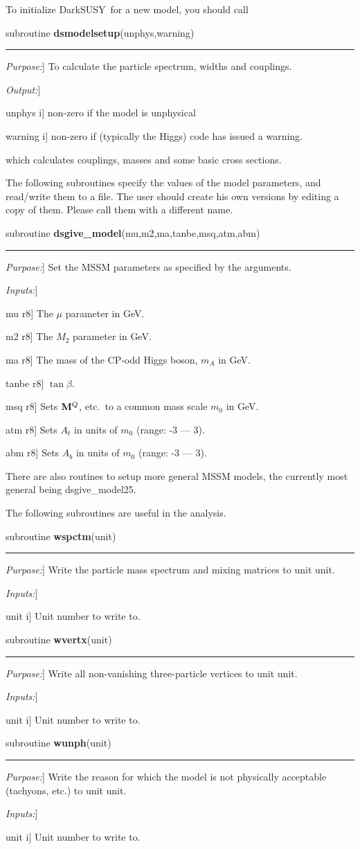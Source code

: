 \documentclass[a4paper,10pt,oneside]{book}
\newcommand{\code}[1]{\ft{#1}}
\newcommand{\ds}{{\sffamily DarkSUSY}}
\newenvironment{allsubs}{\begin{list}{}{\setlength{\labelsep}{0.0 cm}
\setlength{\labelwidth}{0.0 cm} \setlength{\leftmargin}{0.0 cm}
\setlength{\itemsep}{0.6ex} \setlength{\topsep}{\itemsep}}}{\end{list}}
\newenvironment{subs}{\begin{list}{}{\setlength{\labelwidth}{2.0 cm}
\setlength{\labelsep}{0.5 cm} \setlength{\leftmargin}{3.0 cm}
\setlength{\itemsep}{0.0 cm} \setlength{\parsep}{0.0 cm}
\setlength{\topsep}{0.0 cm} \setlength{\parskip}{0.0 cm}}}{\end{list}}
\newenvironment{sub}[1]%
{\begin{allsubs}\item \tw{#1\raisebox{-0.5ex}{}}\hrule\begin{subs}}
{\end{subs}\end{allsubs}}
\newcommand{\lft}[1]{\makebox[2.0 cm][l]{\em #1}}   %
\newcommand{\lfv}[1]{\makebox[1.5 cm][l]{\sffamily #1}}   %
\newcommand{\itit}[1]{\item[\lft{#1}]}
\newcommand{\itv}[2]{\item[\lfv{#1 \hfill #2}]}
\newcommand{\tw}[1]{\textsf{#1}}
\newcommand{\ft}[1]{\textsf{#1}}
\newcommand{\ftb}[1]{{\bfseries \sffamily #1}}
\begin{document}
\bigskip

To initialize \ds\ for a new model, you should call
\begin{sub}{subroutine \textbf{dsmodelsetup}(unphys,warning)}
  \itit{Purpose:} To calculate the particle spectrum, widths and
    couplings.
  \itit{Output:} 
  \itv{unphys}{i} non-zero if the model is unphysical
  \itv{warning}{i} non-zero if (typically the Higgs) code has issued a warning.
\end{sub}
which calculates couplings, masses and some basic cross sections.

The following subroutines specify the values of the model parameters,
and read/write them to a file. The user should create his own versions
by editing a copy of them. Please call them with a different name.

\begin{sub}{subroutine
  \textbf{dsgive\_model}(mu,m2,ma,tanbe,msq,atm,abm)}
  \itit{Purpose:} Set the MSSM parameters as specified by the
  arguments.
  \itit{Inputs:}
  \itv{mu}{r8} The $\mu$ parameter in GeV.
  \itv{m2}{r8} The $M_2$ parameter in GeV.
  \itv{ma}{r8} The mass of the CP-odd Higgs boson, $m_A$ in
  GeV.
  \itv{tanbe}{r8} $\tan \beta$.
  \itv{msq}{r8} Sets ${\bf M}^Q$, etc.\ to a common mass
  scale $m_0$ in GeV.
  \itv{atm}{r8} Sets $A_t$ in units of $m_0$ (range: -3 --- 3).
  \itv{abm}{r8} Sets $A_b$ in units of $m_0$ (range: -3 --- 3).
\end{sub}

There are also routines to setup more general MSSM models, the currently most general being \code{dsgive\_model25}.

The following subroutines are useful in the analysis.

\begin{sub}{subroutine \ftb{wspctm}(unit)}
  \itit{Purpose:} Write the particle mass spectrum and mixing matrices
  to unit \ft{unit}.
  \itit{Inputs:}
  \itv{unit}{i} Unit number to write to.
\end{sub}

\begin{sub}{subroutine \ftb{wvertx}(unit)}
  \itit{Purpose:} Write all non-vanishing three-particle vertices to
  unit \ft{unit}.
  \itit{Inputs:}
  \itv{unit}{i} Unit number to write to.
\end{sub}

\begin{sub}{subroutine \ftb{wunph}(unit)}
  \itit{Purpose:} Write the reason for which the model is not
  physically acceptable (tachyons, etc.) to unit \ft{unit}.
  \itit{Inputs:}
  \itv{unit}{i} Unit number to write to.
\end{sub}
\end{document}
